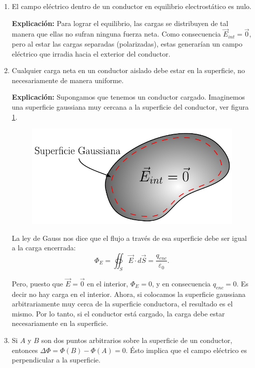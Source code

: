 \begin{enumerate}
\item El campo eléctrico dentro  de un conductor en equilibrio electrostático es nulo.

\textbf{Explicación:} Para lograr el equilibrio, las cargas se distribuyen de tal manera que ellas no sufran ninguna fuerza neta. Como consecuencia $\vec{E}_{int} = \vec{0}$, pero al estar las cargas separadas (polarizadas), estas generarían un campo eléctrico que irradia hacia el exterior del conductor.

\item Cualquier carga neta en un conductor aislado debe estar en la superficie, no necesariamente de manera uniforme.

\textbf{Explicación:} Supongamos que tenemos un conductor cargado. Imaginemos una superficie gaussiana muy cercana a la superficie del conductor, ver figura \ref{fig:Gauss-Conductor}.

\begin{figure}[H]
    \centering
    \includegraphics[scale = 0.57]{Figuras/Conductor-Gauss.pdf}
    \caption{}
    \label{fig:Gauss-Conductor}
\end{figure}

La ley de Gauss nos dice que el flujo a través de esa superficie debe ser igual a la carga encerrada:
$$\Phi_{E} = \oiint_S \vec{E} \cdot d\vec{S} = \frac{q_{enc}}{\varepsilon_0}.$$

Pero, puesto que $\vec{E} = \vec{0}$ en el interior, $\Phi_{E} = 0$, y en consecuencia $q_{enc} = 0$. Es decir no hay carga en el interior. Ahora, si colocamos la superficie gaussiana arbitrariamente muy cerca de la superficie conductora, el resultado es el mismo. Por lo tanto, si el conductor está cargado, la carga debe estar necesariamente en la superficie.

\item Si $A$ y $B$ son dos puntos arbitrarios sobre la superficie de un conductor, entonces $\Delta \Phi = \Phi(B) - \Phi(A) = 0$. Ésto implica que el campo eléctrico es perpendicular a la superficie.


\end{enumerate}
